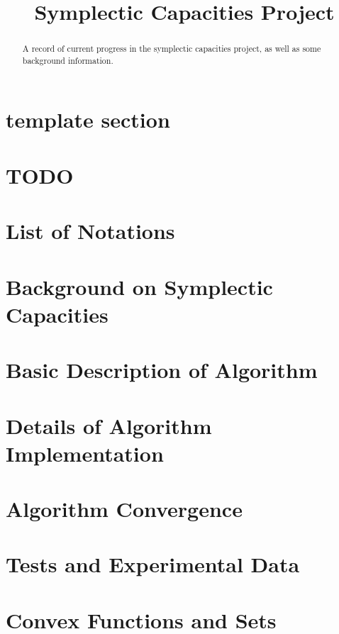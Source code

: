 \documentclass{amsart}
\title{Symplectic Capacities Project}
\theoremstyle{theorem}
\theoremstyle{Definition}
\theoremstyle{remark}
\begin{document}
	
	\begin{abstract}
		A record of current progress in the symplectic capacities project, as well as some background information. 
	\end{abstract}
	\maketitle
	\tableofcontents

	
	\section{template section} 
	 
	
	\section{TODO} 
	 
	
	\section{List of Notations} 
	
	
	\section{Background on Symplectic Capacities}
	
	
	\section{Basic Description of Algorithm} \label{discreteproblem}
	
	
	\section{Details of Algorithm Implementation}
	
	
	\section{Algorithm Convergence}
	
	
	\section{Tests and Experimental Data}
	
	
	\section{Convex Functions and Sets}
	
	


	
\end{document}
